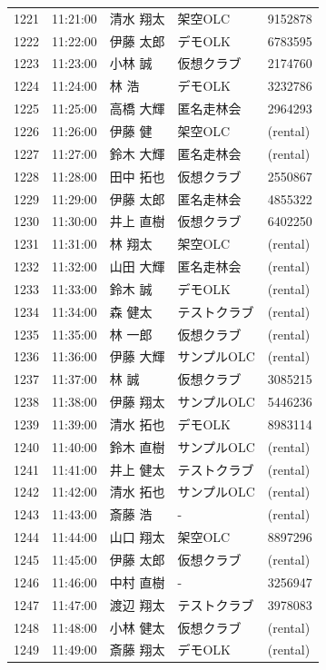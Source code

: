 \documentclass[a4paper,10pt]{ltjsarticle}
\begin{document}
\begin{longtable}{rl>{\raggedright\arraybackslash}p{}>{\raggedright\arraybackslash}p{}l}
1221 & 11:21:00 & 清水 翔太 & 架空OLC & 9152878 \\
1222 & 11:22:00 & 伊藤 太郎 & デモOLK & 6783595 \\
1223 & 11:23:00 & 小林 誠 & 仮想クラブ & 2174760 \\
1224 & 11:24:00 & 林 浩 & デモOLK & 3232786 \\
1225 & 11:25:00 & 高橋 大輝 & 匿名走林会 & 2964293 \\
1226 & 11:26:00 & 伊藤 健 & 架空OLC & (rental) \\
1227 & 11:27:00 & 鈴木 大輝 & 匿名走林会 & (rental) \\
1228 & 11:28:00 & 田中 拓也 & 仮想クラブ & 2550867 \\
1229 & 11:29:00 & 伊藤 太郎 & 匿名走林会 & 4855322 \\
1230 & 11:30:00 & 井上 直樹 & 仮想クラブ & 6402250 \\
1231 & 11:31:00 & 林 翔太 & 架空OLC & (rental) \\
1232 & 11:32:00 & 山田 大輝 & 匿名走林会 & (rental) \\
1233 & 11:33:00 & 鈴木 誠 & デモOLK & (rental) \\
1234 & 11:34:00 & 森 健太 & テストクラブ & (rental) \\
1235 & 11:35:00 & 林 一郎 & 仮想クラブ & (rental) \\
1236 & 11:36:00 & 伊藤 大輝 & サンプルOLC & (rental) \\
1237 & 11:37:00 & 林 誠 & 仮想クラブ & 3085215 \\
1238 & 11:38:00 & 伊藤 翔太 & サンプルOLC & 5446236 \\
1239 & 11:39:00 & 清水 拓也 & デモOLK & 8983114 \\
1240 & 11:40:00 & 鈴木 直樹 & サンプルOLC & (rental) \\
1241 & 11:41:00 & 井上 健太 & テストクラブ & (rental) \\
1242 & 11:42:00 & 清水 拓也 & サンプルOLC & (rental) \\
1243 & 11:43:00 & 斎藤 浩 & - & (rental) \\
1244 & 11:44:00 & 山口 翔太 & 架空OLC & 8897296 \\
1245 & 11:45:00 & 伊藤 太郎 & 仮想クラブ & (rental) \\
1246 & 11:46:00 & 中村 直樹 & - & 3256947 \\
1247 & 11:47:00 & 渡辺 翔太 & テストクラブ & 3978083 \\
1248 & 11:48:00 & 小林 健太 & 仮想クラブ & (rental) \\
1249 & 11:49:00 & 斎藤 翔太 & デモOLK & (rental) \\

\end{longtable}
\end{document}
